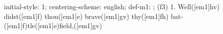 initial-style: 1;
centering-scheme: english;
def-m1: \grealign;
(f3) 1. Well([em1]hv) didst([em1]f) thou([em1]e) brave([em1]gv) thy([em1]fh) bat-([em1]f)tle([em1]e)field,([em1]gv)
